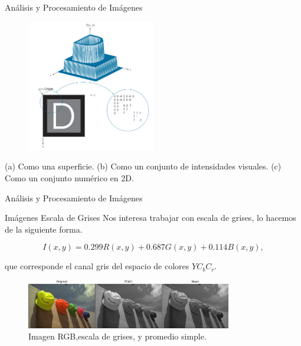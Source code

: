 \documentclass{beamer}
\begin{document}
\begin{frame}{Análisis y Procesamiento de Imágenes}
    \begin{figure}[H]
        \centering
        \includegraphics[width=0.5\textwidth]{dip_4_fig2_18.png}
    \end{figure}        
    (a) Como una superficie.
    (b) Como un conjunto de intensidades visuales.
    (c) Como un conjunto numérico en 2D.
\end{frame}

\begin{frame}{Análisis y Procesamiento de Imágenes}
    \begin{block}{Im\'agenes Escala de Grises}
        Nos interesa trabajar con escala de grises, lo hacemos de la siguiente forma.

        \begin{equation}
            I(x, y)=0.299 R(x, y)+0.687 G(x, y)+0.114 B(x, y), 
            \label{eq:grayscale}
        \end{equation}

        que corresponde el canal gris del espacio de colores $YC_bC_r$.
    \end{block}

    \begin{figure}[H]
        \centering
        \includegraphics[width=0.8\textwidth]{img_ex_bw.png}
        \caption{Imagen RGB,escala de grises, y promedio simple.}
    \end{figure}
\end{frame}
\end{document}
